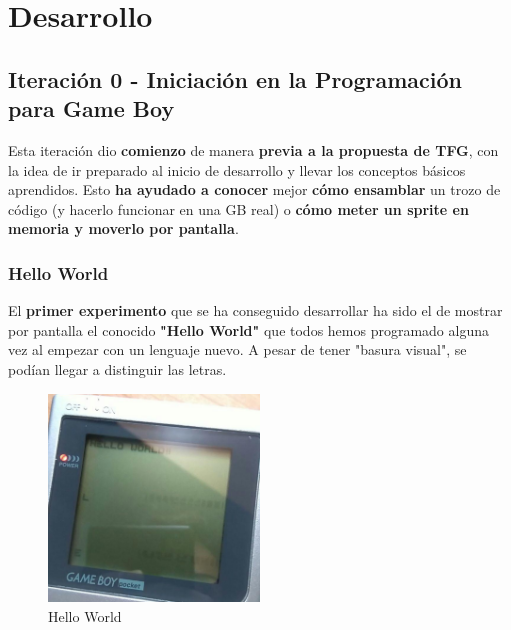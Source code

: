 \chapter{Desarrollo}
\label{ep:development}

\section{Iteración 0 - Iniciación en la Programación para Game Boy}

Esta iteración dio \textbf{comienzo} de manera \textbf{previa a la propuesta de TFG}, con la idea de ir preparado al inicio de desarrollo y llevar los conceptos básicos aprendidos. Esto \textbf{ha ayudado a conocer} mejor \textbf{cómo ensamblar} un trozo de código (y hacerlo funcionar en una GB real) o \textbf{cómo meter un sprite en memoria y moverlo por pantalla}.

\subsection{Hello World}

El \textbf{primer experimento} que se ha conseguido desarrollar ha sido el de mostrar por pantalla el conocido \textbf{"Hello World"} que todos hemos programado alguna vez al empezar con un lenguaje nuevo. A pesar de tener "basura visual", se podían llegar a distinguir las letras.

\begin{figure}[h]
\centering
\includegraphics[width=0.5\textwidth]{include/images/desarrollo/hello_world.png}
\caption{Hello World}
\label{figure:hello_world}
\end{figure}

